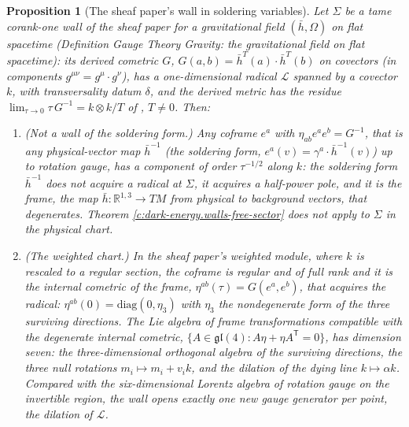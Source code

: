 \documentclass[11pt]{article}
\newtheorem{proposition}[theorem]{Proposition}
\theoremstyle{definition}
\theoremstyle{plain}
\newcommand{\changedmark}[2]{\marginpar{\raggedright\scriptsize\color{#1}#2}}
\providecommand{\hb}{}\renewcommand{\hb}{\bar{h}}
\begin{document}
\begin{proposition}[The sheaf paper's wall in soldering variables]\label{c:dark-energy.sheaf-papers-wall-soldering-variables}
\changedmark{gray}{reworded}
Let $\Sigma$ be a tame corank-one wall of the sheaf paper \cite[Hyp.~2.1, Thm.~3.1]{ButlerT4} for a gravitational field $(\hb, \Omega)$ on flat spacetime (Definition \emph{Gauge Theory Gravity: the gravitational field on flat spacetime}): its derived cometric $G$, $G(a,b) = \hb^{T}(a) \cdot \hb^{T}(b)$ on covectors (in components $g^{\mu\nu} = g^\mu \cdot g^\nu$), has a one-dimensional radical $\mathcal{L}$ spanned by a covector $k$, with transversality datum $\delta$, and the derived metric has the residue $\lim_{\tau\to 0}\tau\, G^{-1} = k\otimes k/T$ of \cite[Thm.~6.2]{ButlerT4}, $T \neq 0$. Then:
\begin{enumerate}
\item[(i)] \emph{(Not a wall of the soldering form.)} Any coframe $e^a$ with $\eta_{ab}e^a e^b = G^{-1}$, that is any physical-vector map $\hb^{-1}$ (the soldering form, $e^a(v) = \gamma^a \cdot \hb^{-1}(v)$) up to rotation gauge, has a component of order $\tau^{-1/2}$ along $k$: the soldering form $\hb^{-1}$ does not acquire a radical at $\Sigma$, it acquires a half-power pole, and it is the frame, the map $\hb : \mathbb{R}^{1,3} \to TM$ from physical to background vectors, that degenerates. Theorem \ref{c:dark-energy.walls-free-sector} does not apply to $\Sigma$ in the physical chart.
\item[(ii)] \emph{(The weighted chart.)} In the sheaf paper's weighted module, where $k$ is rescaled to a regular section, the coframe is regular and of full rank and it is the internal cometric of the frame, $\eta^{ab}(\tau) = G(e^a, e^b)$, that acquires the radical: $\eta^{ab}(0) = \mathrm{diag}(0, \eta_3)$ with $\eta_3$ the nondegenerate form of the three surviving directions. The Lie algebra of frame transformations compatible with the degenerate internal cometric, $\{A \in \mathfrak{gl}(4) : A\eta + \eta A^{\mathsf T} = 0\}$, has dimension seven: the three-dimensional orthogonal algebra of the surviving directions, the three null rotations $m_i \mapsto m_i + v_i k$, and the dilation of the dying line $k \mapsto \alpha k$. Compared with the six-dimensional Lorentz algebra of rotation gauge on the invertible region, the wall opens exactly one new gauge generator per point, the dilation of $\mathcal{L}$.

\end{enumerate}
\end{proposition}
\end{document}
